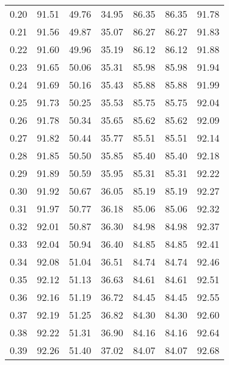 \begin{tabular}{|c|c|c|c|c|c|c|}
      0.20 &     91.51 &     49.76 &      34.95 &   86.35 &      86.35 &         91.78 \\
      0.21 &     91.56 &     49.87 &      35.07 &   86.27 &      86.27 &         91.83 \\
      0.22 &     91.60 &     49.96 &      35.19 &   86.12 &      86.12 &         91.88 \\
      0.23 &     91.65 &     50.06 &      35.31 &   85.98 &      85.98 &         91.94 \\
      0.24 &     91.69 &     50.16 &      35.43 &   85.88 &      85.88 &         91.99 \\
      0.25 &     91.73 &     50.25 &      35.53 &   85.75 &      85.75 &         92.04 \\
      0.26 &     91.78 &     50.34 &      35.65 &   85.62 &      85.62 &         92.09 \\
      0.27 &     91.82 &     50.44 &      35.77 &   85.51 &      85.51 &         92.14 \\
      0.28 &     91.85 &     50.50 &      35.85 &   85.40 &      85.40 &         92.18 \\
      0.29 &     91.89 &     50.59 &      35.95 &   85.31 &      85.31 &         92.22 \\
      0.30 &     91.92 &     50.67 &      36.05 &   85.19 &      85.19 &         92.27 \\
      0.31 &     91.97 &     50.77 &      36.18 &   85.06 &      85.06 &         92.32 \\
      0.32 &     92.01 &     50.87 &      36.30 &   84.98 &      84.98 &         92.37 \\
      0.33 &     92.04 &     50.94 &      36.40 &   84.85 &      84.85 &         92.41 \\
      0.34 &     92.08 &     51.04 &      36.51 &   84.74 &      84.74 &         92.46 \\
      0.35 &     92.12 &     51.13 &      36.63 &   84.61 &      84.61 &         92.51 \\
      0.36 &     92.16 &     51.19 &      36.72 &   84.45 &      84.45 &         92.55 \\
      0.37 &     92.19 &     51.25 &      36.82 &   84.30 &      84.30 &         92.60 \\
      0.38 &     92.22 &     51.31 &      36.90 &   84.16 &      84.16 &         92.64 \\
      0.39 &     92.26 &     51.40 &      37.02 &   84.07 &      84.07 &         92.68 \\

\end{tabular}
